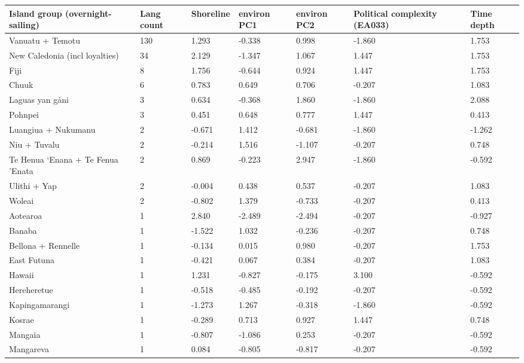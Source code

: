 \begin{longtable}{p{4.5cm}p{1.4cm}p{1.4cm}p{1.7cm}p{1.7cm}p{1.7cm}p{1.7cm}}
  \toprule
Island group (overnight-sailing) & Lang count & Shoreline & environ PC1 & environ PC2 & Political complexity (EA033) & Time depth \\ 
  \midrule
Vanuatu + Temotu & 130 & 1.293 & -0.338 & 0.998 & -1.860 & 1.753 \\ 
  New Caledonia (incl loyalties) & 34 & 2.129 & -1.347 & 1.067 & 1.447 & 1.753 \\ 
  Fiji & 8 & 1.756 & -0.644 & 0.924 & 1.447 & 1.753 \\ 
  Chuuk & 6 & 0.783 & 0.649 & 0.706 & -0.207 & 1.083 \\ 
  Laguas yan gåni & 3 & 0.634 & -0.368 & 1.860 & -1.860 & 2.088 \\ 
  Pohnpei & 3 & 0.451 & 0.648 & 0.777 & 1.447 & 0.413 \\ 
  Luangiua + Nukumanu & 2 & -0.671 & 1.412 & -0.681 & -1.860 & -1.262 \\ 
  Niu + Tuvalu & 2 & -0.214 & 1.516 & -1.107 & -0.207 & 0.748 \\ 
  Te Henua ‘Enana + Te Fenua ’Enata & 2 & 0.869 & -0.223 & 2.947 & -1.860 & -0.592 \\ 
  Ulithi + Yap & 2 & -0.004 & 0.438 & 0.537 & -0.207 & 1.083 \\ 
  Woleai & 2 & -0.802 & 1.379 & -0.733 & -0.207 & 0.413 \\ 
  Aotearoa & 1 & 2.840 & -2.489 & -2.494 & -0.207 & -0.927 \\ 
  Banaba & 1 & -1.522 & 1.032 & -0.236 & -0.207 & 0.748 \\ 
  Bellona + Rennelle & 1 & -0.134 & 0.015 & 0.980 & -0.207 & 1.753 \\ 
  East Futuna & 1 & -0.421 & 0.067 & 0.384 & -0.207 & 1.083 \\ 
  Hawaii & 1 & 1.231 & -0.827 & -0.175 & 3.100 & -0.592 \\ 
  Hereheretue & 1 & -0.518 & -0.485 & -0.192 & -0.207 & -0.592 \\ 
  Kapingamarangi & 1 & -1.273 & 1.267 & -0.318 & -1.860 & -0.592 \\ 
  Kosrae & 1 & -0.289 & 0.713 & 0.927 & 1.447 & 0.748 \\ 
  Mangaia & 1 & -0.807 & -1.086 & 0.253 & -0.207 & -0.592 \\ 
  Mangareva & 1 & 0.084 & -0.805 & -0.817 & -0.207 & -0.592 \\ 

\end{longtable}
